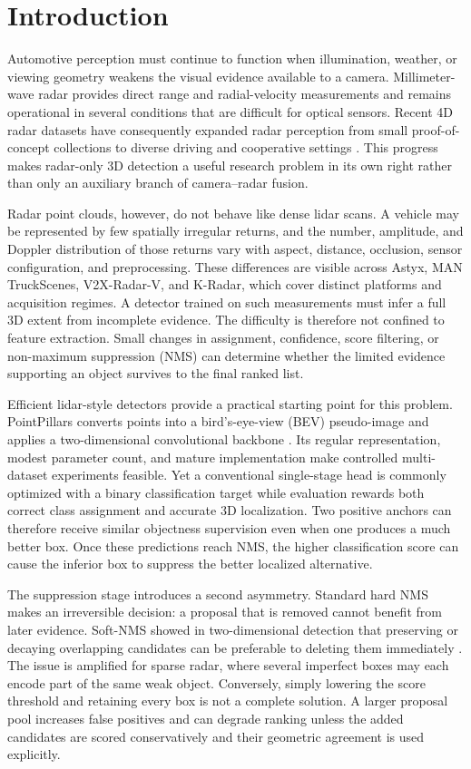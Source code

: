 \documentclass[preprint,12pt,times]{elsarticle}
\begin{document}
\section{Introduction}

Automotive perception must continue to function when illumination, weather,
or viewing geometry weakens the visual evidence available to a camera.
Millimeter-wave radar provides direct range and radial-velocity measurements
and remains operational in several conditions that are difficult for optical
sensors. Recent 4D radar datasets have consequently expanded radar perception
from small proof-of-concept collections to diverse driving and cooperative
settings \cite{paek2022kradar,yang2024v2xradar}. This progress makes
radar-only 3D detection a useful research problem in its own right rather than
only an auxiliary branch of camera--radar fusion.

Radar point clouds, however, do not behave like dense lidar scans. A vehicle
may be represented by few spatially irregular returns, and the number,
amplitude, and Doppler distribution of those returns vary with aspect,
distance, occlusion, sensor configuration, and preprocessing. These
differences are visible across Astyx, MAN TruckScenes, V2X-Radar-V, and
K-Radar, which cover distinct platforms and acquisition regimes. A detector
trained on such measurements must infer a full 3D extent from incomplete
evidence. The difficulty is therefore not confined to feature extraction.
Small changes in assignment, confidence, score filtering, or non-maximum
suppression (NMS) can determine whether the limited evidence supporting an
object survives to the final ranked list.

Efficient lidar-style detectors provide a practical starting point for this
problem. PointPillars converts points into a bird's-eye-view (BEV) pseudo-image
and applies a two-dimensional convolutional backbone
\cite{lang2019pointpillars}. Its regular representation, modest parameter
count, and mature implementation make controlled multi-dataset experiments
feasible. Yet a conventional single-stage head is commonly optimized with a
binary classification target while evaluation rewards both correct class
assignment and accurate 3D localization. Two positive anchors can therefore
receive similar objectness supervision even when one produces a much better
box. Once these predictions reach NMS, the higher classification score can
cause the inferior box to suppress the better localized alternative.

The suppression stage introduces a second asymmetry. Standard hard NMS makes
an irreversible decision: a proposal that is removed cannot benefit from
later evidence. Soft-NMS showed in two-dimensional detection that preserving
or decaying overlapping candidates can be preferable to deleting them
immediately \cite{bodla2017softnms}. The issue is amplified for sparse radar,
where several imperfect boxes may each encode part of the same weak object.
Conversely, simply lowering the score threshold and retaining every box is not
a complete solution. A larger proposal pool increases false positives and can
degrade ranking unless the added candidates are scored conservatively and
their geometric agreement is used explicitly.
\end{document}

